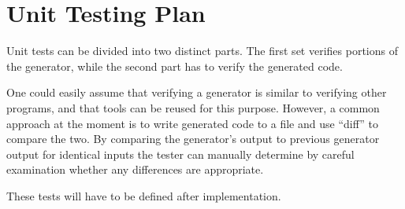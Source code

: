 \documentclass[12pt, titlepage]{article}
\begin{document}
					
					
					
					



				
\section{Unit Testing Plan}
		
Unit tests can be divided into two distinct parts. The first set verifies 
portions of the generator, while the second part has to verify the generated 
code.

One could easily assume that verifying a generator is similar to verifying 
other programs, and that tools can be reused for this purpose. However, a 
common approach at the moment is to write generated code to a file and use 
``diff'' to compare the two.
By comparing the generator's output to previous generator output for identical 
inputs the tester can manually determine by careful examination whether any 
differences are appropriate.

These tests will have to be defined after implementation.







\newpage

%
%
%
%
%
\end{document}
